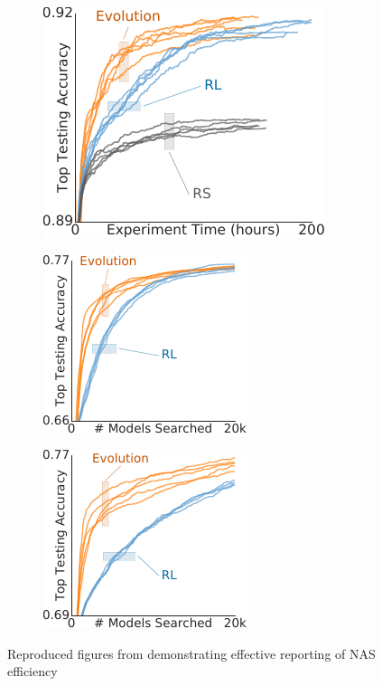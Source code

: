 \begin{figure}[t]
	\centering
	\begin{subfigure}{0.3\textwidth}
		\includegraphics[scale=0.8]{AutoKeras_1}
	\end{subfigure}
	\begin{subfigure}{0.3\textwidth}
		\includegraphics{AutoKeras_2}
	\end{subfigure}
	\begin{subfigure}{0.3\textwidth}
		\includegraphics{AutoKeras_3}
	\end{subfigure}
	\caption{Reproduced figures from \citep{Jin2018} demonstrating effective reporting of NAS efficiency}
	\label{fig:reproduce}
\end{figure}
